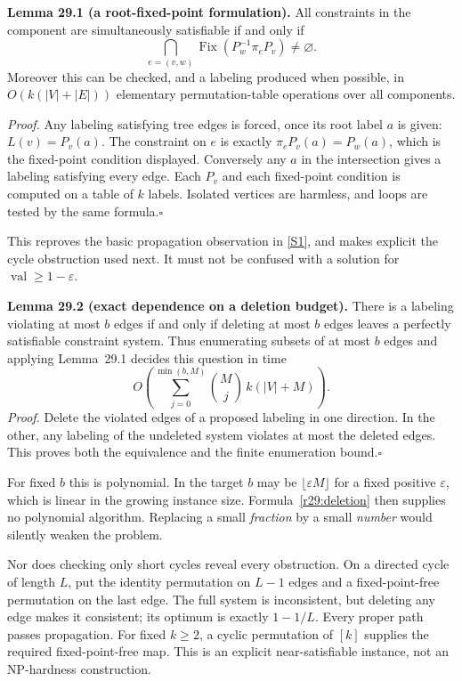 \documentclass[11pt,a4paper]{article}
\newcommand{\sref}[2]{\hyperlink{source:#1:#2}{[S#2]}}
\numberwithin{equation}{section}
\begin{document}
\textbf{Lemma 29.1 (a root-fixed-point formulation).}
All constraints in the component are simultaneously satisfiable if and
only if
\begin{equation}\label{r29:holonomy}
 \bigcap_{e=(v,w)}\operatorname{Fix}(P_w^{-1}\pi_eP_v)
                       \ne\varnothing.
\end{equation}
Moreover this can be checked, and a labeling produced when possible, in
$O(k(|V|+|E|))$ elementary permutation-table operations over all components.

\emph{Proof.} Any labeling satisfying tree edges is forced, once its root
label $a$ is given: $L(v)=P_v(a)$. The constraint on $e$ is exactly
$\pi_eP_v(a)=P_w(a)$, which is the fixed-point condition displayed.
Conversely any $a$ in the intersection gives a labeling satisfying every
edge. Each $P_v$ and each fixed-point condition is computed on a table
of $k$ labels. Isolated vertices are harmless, and loops are tested by
the same formula.\hfill$\square$

This reproves the basic propagation observation in \sref{43}{1}, and
makes explicit the cycle obstruction used next. It must not be confused
with a solution for $\operatorname{val}\ge1-\varepsilon$.

\textbf{Lemma 29.2 (exact dependence on a deletion budget).}
There is a labeling violating at most $b$ edges if and only if deleting
at most $b$ edges leaves a perfectly satisfiable constraint system.
Thus enumerating subsets of at most $b$ edges and applying
Lemma~29.1 decides this question in time
\begin{equation}\label{r29:deletion}
       O\!\left(\sum_{j=0}^{\min(b,M)}\binom Mj\,k(|V|+M)\right).
\end{equation}
\emph{Proof.} Delete the violated edges of a proposed labeling in one
direction. In the other, any labeling of the undeleted system violates
at most the deleted edges. This proves both the equivalence and the
finite enumeration bound.\hfill$\square$

For fixed $b$ this is polynomial. In the target $b$ may be
$\lfloor\varepsilon M\rfloor$ for a fixed positive $\varepsilon$, which
is linear in the growing instance size. Formula~\eqref{r29:deletion}
then supplies no polynomial algorithm. Replacing a small \emph{fraction}
by a small \emph{number} would silently weaken the problem.

Nor does checking only short cycles reveal every obstruction. On a
directed cycle of length $L$, put the identity permutation on $L-1$
edges and a fixed-point-free permutation on the last edge. The full
system is inconsistent, but deleting any edge makes it consistent;
its optimum is exactly $1-1/L$. Every proper path passes propagation.
For fixed $k\ge2$, a cyclic permutation of $[k]$ supplies the required
fixed-point-free map. This is an explicit near-satisfiable instance, not
an NP-hardness construction.
\end{document}
